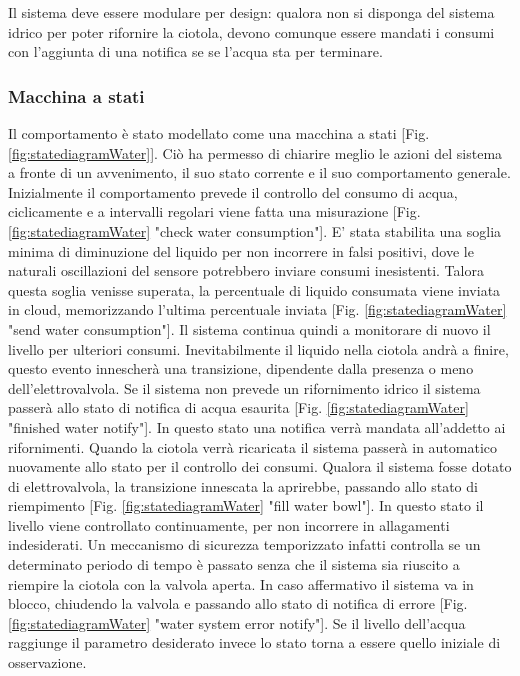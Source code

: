     Il sistema deve essere modulare per design: qualora non si disponga del sistema idrico per poter rifornire la ciotola, devono comunque essere mandati i consumi con l'aggiunta di una notifica se se l'acqua sta per terminare.
    
    \subsubsection{Macchina a stati} Il comportamento è stato modellato come una macchina a stati [Fig. \ref{fig:statediagramWater}]. Ciò ha permesso di chiarire meglio le azioni del sistema a fronte di un avvenimento, il suo stato corrente e il suo comportamento generale.
    Inizialmente il comportamento prevede il controllo del consumo di acqua, ciclicamente e a intervalli regolari viene fatta una misurazione [Fig. \ref{fig:statediagramWater} "check water consumption"]. 
    E' stata stabilita una soglia minima di diminuzione del liquido per non incorrere in falsi positivi, dove le naturali oscillazioni del sensore potrebbero inviare consumi inesistenti. 
    Talora questa soglia venisse superata, la percentuale di liquido consumata viene inviata in cloud, memorizzando l'ultima percentuale inviata [Fig. \ref{fig:statediagramWater} "send water consumption"]. Il sistema continua quindi a monitorare di nuovo il livello per ulteriori consumi. 
    Inevitabilmente il liquido nella ciotola andrà a finire, questo evento innescherà una transizione, dipendente dalla presenza o meno dell'elettrovalvola. 
    Se il sistema non prevede un rifornimento idrico il sistema passerà allo stato di notifica di acqua esaurita [Fig. \ref{fig:statediagramWater} "finished water notify"]. In questo stato una notifica verrà mandata all'addetto ai rifornimenti. Quando la ciotola verrà ricaricata il sistema passerà in automatico nuovamente allo stato per il controllo dei consumi.
    Qualora il sistema fosse dotato di elettrovalvola, la transizione innescata la aprirebbe, passando allo stato di riempimento [Fig. \ref{fig:statediagramWater} "fill water bowl"]. In questo stato il livello viene controllato continuamente, per non incorrere in allagamenti indesiderati. 
    Un meccanismo di sicurezza temporizzato infatti controlla se un determinato periodo di tempo è passato senza che il sistema sia riuscito a riempire la ciotola con la valvola aperta. In caso affermativo il sistema va in blocco, chiudendo la valvola e passando allo stato di notifica di errore [Fig. \ref{fig:statediagramWater} "water system error notify"]. 
    Se il livello dell'acqua raggiunge il parametro desiderato invece lo stato torna a essere quello iniziale di osservazione.
    
